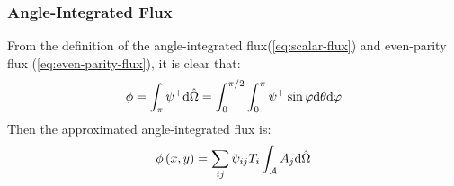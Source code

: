 \begin{frame}
  \frametitle{Angle-Integrated Flux}
  From the definition of the angle-integrated flux(\cref{eq:scalar-flux}) and even-parity flux (\cref{eq:even-parity-flux}), it is clear that:
  \begin{equation}
    \phi = \int_\pi \psi^+ \dd\hat{\Omega} = \int_0^{\pi/2}\int_0^{\pi}\psi^+\sin\varphi\dd \theta\dd\varphi
  \end{equation}
  Then the approximated angle-integrated flux is:
  \begin{equation}
    \phi \left(x,y\right)=\sum_{ij}\psi_{ij} T_i\int_\mathcal{A}A_j \dd\hat{\Omega}
  \end{equation}
\end{frame}